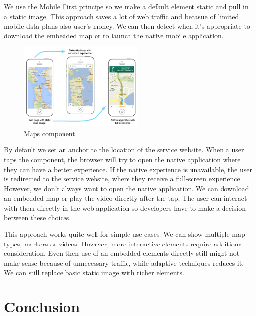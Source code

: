 \documentclass{iitsrc}
\begin{document}
We use the Mobile First principe so we make a default element static and pull in a static image. This approach saves a lot of web traffic and becasue of limited mobile data plans also user's money. We can then detect when it's appropriate to download the embedded map or to launch the native mobile application.

\begin{figure}[ht]
    \begin{center}
        \includegraphics[width=0.55\textwidth]{../images/maps.png}
        \caption{Maps component}
        \label{fig:maps}
    \end{center}
\end{figure}

By default we set an anchor to the location of the service website. When a user taps the component, the browser will try to open the native application where they can have a better experience. If the native experience is unavailable, the user is redirected to the service website, where they receive a full-screen experience. However, we don't always want to open the native application. We can download an embedded map or play the video directly after the tap. The user can interact with them directly in the web application so developers have to make a decision between these choices.

This approach works quite well for simple use cases. We can show multiple map types, markers or videos. However, more interactive elements require additional consideration. Even then use of an embedded elements directly still might not make sense because of unnecessary traffic, while adaptive techniques reduces it. We can still replace basic static image with richer elements.




\section{Conclusion} %
\label{sec:conclusion}
\end{document}

